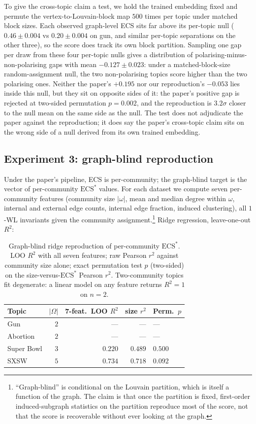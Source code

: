 \documentclass[letterpaper]{article} %
\begin{document}
To give the cross-topic claim a test, we hold the trained
embedding fixed and permute the vertex-to-Louvain-block map
$500$ times per topic under matched block sizes. Each observed
graph-level ECS sits far above its per-topic null
($0.46 \pm 0.004$ vs $0.20 \pm 0.004$ on gun, and similar
per-topic separations on the other three), so the score does
track its own block partition. Sampling one gap per draw from
these four per-topic nulls gives a distribution of
polarising-minus-non-polarising gaps with mean
$-0.127 \pm 0.023$: under a matched-block-size random-assignment
null, the two non-polarising topics score higher than the two
polarising ones. Neither the paper's $+0.195$ nor our
reproduction's $-0.053$ lies inside this null, but they sit on
opposite sides of it: the paper's positive gap is rejected at
two-sided permutation $p = 0.002$, and the reproduction is
$3.2\sigma$ closer to the null mean on the same side as the
null. The test does not adjudicate the paper against the
reproduction; it does say the paper's cross-topic claim sits on
the wrong side of a null derived from its own trained
embedding.

\subsection{Experiment 3: graph-blind reproduction}\label{sec:exp-blind}

Under the paper's pipeline, ECS is per-community; the graph-blind
target is the vector of per-community $\mathrm{ECS}^*$ values. For
each dataset we compute seven per-community features (community
size $|\omega|$, mean and median degree within $\omega$, internal
and external edge counts, internal edge fraction, induced
clustering), all $1$-WL invariants given the community
assignment.\footnote{``Graph-blind'' is conditional on the Louvain
partition, which is itself a function of the graph. The claim is
that once the partition is fixed, first-order induced-subgraph
statistics on the partition reproduce most of the score, not that
the score is recoverable without ever looking at the graph.}
Ridge regression, leave-one-out $R^2$:

\begin{table}[t]
\centering
\small
\begin{tabular}{lrrrl}
\toprule
Topic & $|\Omega|$ & 7-feat.\ LOO $R^2$ & size $r^2$ & Perm.\ $p$ \\
\midrule
Gun        & $2$ & --- & --- & --- \\
Abortion   & $2$ & --- & --- & --- \\
Super Bowl & $3$ & $0.220$ & $0.489$ & $0.500$ \\
SXSW       & $5$ & $0.734$ & $0.718$ & $0.092$ \\
\bottomrule
\end{tabular}
\caption{Graph-blind ridge reproduction of per-community
$\mathrm{ECS}^*$. LOO $R^2$ with all seven features; raw Pearson
$r^2$ against community size alone; exact permutation test $p$
(two-sided) on the size-versus-$\mathrm{ECS}^*$ Pearson $r^2$.
Two-community topics fit degenerate: a linear model on any
feature returns $R^2 = 1$ on $n = 2$.}\label{tab:blind}
\end{table}
\end{document}
